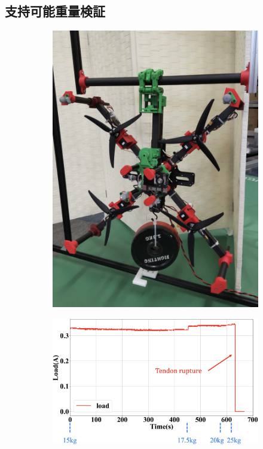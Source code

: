 \documentclass{jarticle}
\begin{document}
\subsection{支持可能重量検証}
\begin{figure}[tb]
  \centering
  \begin{subfigure}{0.28\columnwidth}
    \includegraphics[width=\textwidth]{figs/bear1.eps}
    \vspace{-6mm}
    \caption{}
    \label{fig:bear1}
  \end{subfigure}
  \begin{subfigure}{0.6\columnwidth}
    \includegraphics[width=\textwidth]{figs/bear2.eps}

\end{subfigure}
\end{figure}
\end{document}
